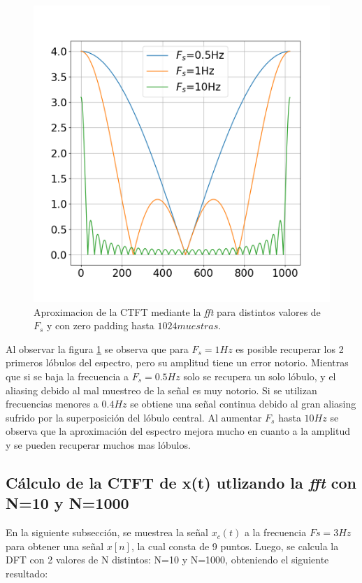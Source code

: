 \documentclass[11pt,a4paper]{article}
\begin{document}
\begin{figure}[H]
    \centering
    \includegraphics[width=.6\textwidth]{Img/punto_4_d.png}
    \caption{Aproximacion de la CTFT mediante la \textit{fft} para distintos valores de $F_s$ y con zero padding hasta $1024muestras$.}
    \label{fig.4d}
\end{figure}

Al observar la figura \ref{fig.4d} se observa que para $F_s=1Hz$ es posible recuperar los 2 primeros lóbulos del espectro, pero su amplitud 
tiene un error notorio. Mientras que si se baja la frecuencia a $F_s=0.5Hz$ solo se recupera un solo lóbulo, y el aliasing debido al mal muestreo de la señal es muy notorio. Si se utilizan frecuencias menores a $0.4Hz$ se obtiene una señal continua debido al gran aliasing sufrido por la superposición del lóbulo central. Al aumentar $F_s$ hasta $10Hz$ se observa que la aproximación del espectro mejora mucho en cuanto a la amplitud y se pueden recuperar 
muchos mas lóbulos.

 \subsection{Cálculo de la CTFT de x(t) utlizando la \textit{fft} con N=10 y N=1000}
 En la siguiente subsección, se muestrea la señal $x_{c}(t)$ a la frecuencia $Fs=3 Hz$ para obtener una señal $x[n]$, la cual consta de 9 puntos. Luego, se calcula la DFT con 2 valores de N distintos: N=10 y N=1000, obteniendo el siguiente resultado:
 
\end{document}
